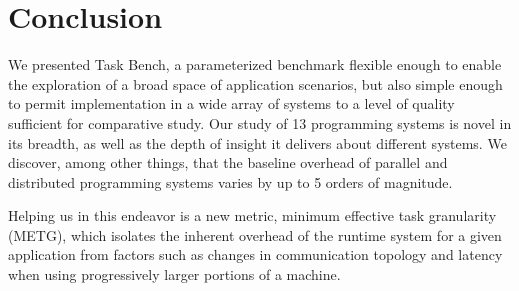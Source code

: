 \section{Conclusion}
\label{sec:conclusion}

We presented Task Bench, a parameterized benchmark flexible enough to
enable the exploration of a broad space of application scenarios, but
also simple enough to permit implementation in a wide array of systems
to a level of quality sufficient for comparative study. Our study of
13 programming systems is novel in its breadth, as well as the depth
of insight it delivers about different systems. We discover, among
other things, that the baseline overhead of parallel and distributed
programming systems varies by up to 5 orders of magnitude.

Helping us in this endeavor is a new metric, minimum effective task
granularity (METG), which isolates the inherent overhead of the
runtime system for a given application from factors such as changes in
communication topology and latency when using progressively larger
portions of a machine.
